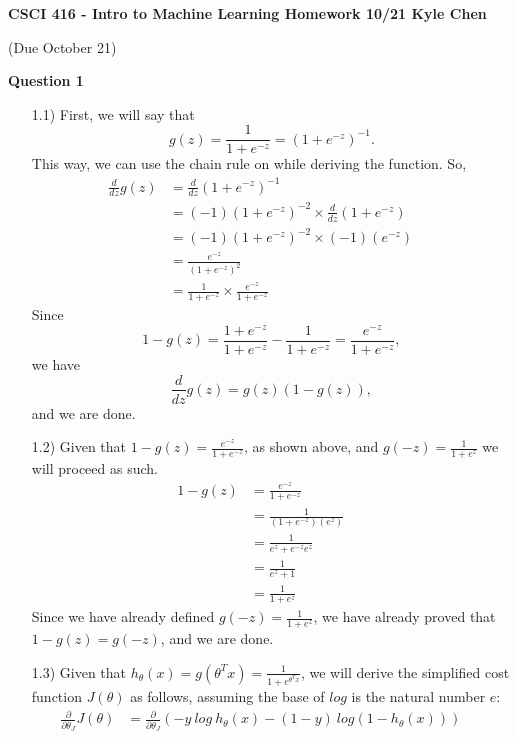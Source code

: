 \documentclass[12pt]{article} %
\newcommand{\D}{\partial}
\begin{document}
 
\noindent
\textbf{CSCI 416 - Intro to Machine Learning \quad 
Homework 10/21 \hfill Kyle Chen}\\
\begin{center}
  (Due October 21)
\end{center}
\bigskip

\begin{flushleft} %

\textbf{Question 1} 

\begin{enumerate}
	\item [1.1)] First, we will say that \[g(z) = \frac{1}{1+e^{-z}} = (1+e^{-z})^{-1}.\] This way, we can use the chain rule on while deriving the function. So,
		\begin{align*}
			\frac{d}{dz} g(z) &= \frac{d}{dz} (1+e^{-z})^{-1} &&\\
			&= (-1)(1+e^{-z})^{-2} \times \frac{d}{dz} (1+e^{-z}) &&\\
			&= (-1)(1+e^{-z})^{-2} \times (-1)(e^{-z}) &&\\
			&= \frac{e^{-z}}{(1+e^{-z})^{2}} &&\\
			&= \frac{1}{1+e^{-z}}\times \frac{e^{-z}}{1+e^{-z}}
		\end{align*}
		Since \[1 - g(z) = \frac{1+e^{-z}}{1+e^{-z}} - \frac{1}{1+e^{-z}} = \frac{e^{-z}}{1+e^{-z}},\] we have \[\frac{d}{dz} g(z) = g(z)(1-g(z)),\] and we are done.
	\item [1.2)] Given that $1 - g(z) = \frac{e^{-z}}{1+e^{-z}}$, as shown above, and $g(-z) = \frac{1}{1 + e^z}$ we will proceed as such.
		\begin{align*}
			1 - g(z) &= \frac{e^{-z}}{1+e^{-z}} &&\\
			&= \frac{1}{(1+e^{-z})(e^z)} &&\\
			&= \frac{1}{e^z+e^{-z}e^{z}} &&\\
			&= \frac{1}{e^z+1} &&\\
			&= \frac{1}{1+e^z}
		\end{align*}
	Since we have already defined $g(-z) = \frac{1}{1 + e^z}$, we have already proved that $1-g(z) = g(-z)$, and we are done.
	\item [1.3)] Given that $h_\theta(x) = g(\theta^Tx) = \frac{1}{1+e^{\theta^Tx}}$, we will derive the simplified cost function $J(\theta)$ as follows, assuming the base of $log$ is the natural number $e$:
		\begin{align*}
			\frac{\D}{\D\theta_J}J(\theta) &= \frac{\D}{\D\theta_J}(-y\ log\ h_\theta(x) - (1-y)\ log(1-h_\theta(x))) &&\\

\end{align*}
\end{enumerate}
\end{flushleft}
\end{document}
